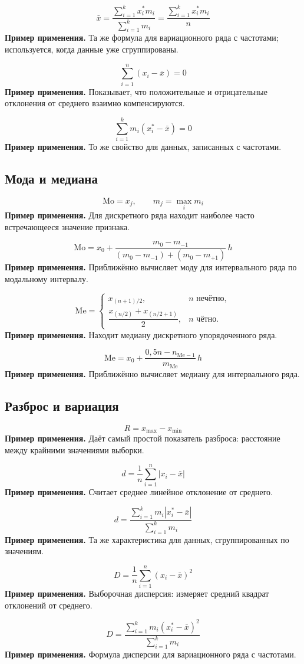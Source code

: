 \documentclass[a4paper,14pt]{extarticle}
\newcommand{\FormulaNote}[2]{%
  \begin{equation*}
  #1
  \end{equation*}
  \noindent\textbf{Пример применения.} #2\par\medskip
}
\begin{document}
\FormulaNote{\bar{x}=\frac{\sum_{i=1}^{k}x_i^*m_i}{\sum_{i=1}^{k}m_i}=\frac{\sum_{i=1}^{k}x_i^*m_i}{n}}{Та же формула для вариационного ряда с частотами; используется, когда данные уже сгруппированы.}

\FormulaNote{\sum_{i=1}^{n}(x_i-\bar{x})=0}{Показывает, что положительные и отрицательные отклонения от среднего взаимно компенсируются.}

\FormulaNote{\sum_{i=1}^{k}m_i(x_i^*-\bar{x})=0}{То же свойство для данных, записанных с частотами.}

\subsection{Мода и медиана}

\FormulaNote{\text{Mo}=x_j,\qquad m_j=\max_i m_i}{Для дискретного ряда находит наиболее часто встречающееся значение признака.}

\FormulaNote{\text{Mo}=x_0+\frac{m_0-m_{-1}}{(m_0-m_{-1})+(m_0-m_{+1})}\,h}{Приближённо вычисляет моду для интервального ряда по модальному интервалу.}

\FormulaNote{\text{Me}=
\begin{cases}
x_{(n+1)/2}, & n \text{ нечётно},\\[0.5ex]
\dfrac{x_{(n/2)}+x_{(n/2+1)}}{2}, & n \text{ чётно}.
\end{cases}}{Находит медиану дискретного упорядоченного ряда.}

\FormulaNote{\text{Me}=x_0+\frac{0{,}5n-n_{\text{Me}-1}}{m_{\text{Me}}}\,h}{Приближённо вычисляет медиану для интервального ряда.}

\subsection{Разброс и вариация}

\FormulaNote{R=x_{\max}-x_{\min}}{Даёт самый простой показатель разброса: расстояние между крайними значениями выборки.}

\FormulaNote{d=\frac{1}{n}\sum_{i=1}^{n}|x_i-\bar{x}|}{Считает среднее линейное отклонение от среднего.}

\FormulaNote{d=\frac{\sum_{i=1}^{k}m_i|x_i^*-\bar{x}|}{\sum_{i=1}^{k}m_i}}{Та же характеристика для данных, сгруппированных по значениям.}

\FormulaNote{D=\frac{1}{n}\sum_{i=1}^{n}(x_i-\bar{x})^2}{Выборочная дисперсия: измеряет средний квадрат отклонений от среднего.}

\FormulaNote{D=\frac{\sum_{i=1}^{k}m_i(x_i^*-\bar{x})^2}{\sum_{i=1}^{k}m_i}}{Формула дисперсии для вариационного ряда с частотами.}
\end{document}
